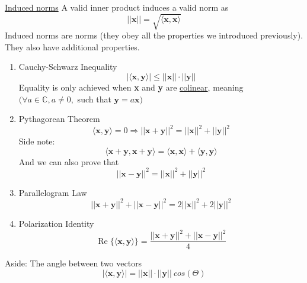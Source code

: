 \documentclass[12pt]{article}
\begin{document}
\underline{Induced norms}
A valid inner product induces a valid norm as 
\begin{equation*}
    ||\mathbf{x}|| = \sqrt{\langle \mathbf{x}, \mathbf{x} \rangle} 
\end{equation*}
Induced norms are norms (they obey all the properties we introduced previously). They also have additional properties. 
\begin{enumerate}
    \item Cauchy-Schwarz Inequality
    \begin{equation*}
        |\langle \mathbf{x}, \mathbf{y} \rangle| \leq ||\mathbf{x}||\cdot||\mathbf{y}||
    \end{equation*}
    Equality is only achieved when \textbf{x} and \textbf{y} are \underline{colinear}, meaning \\ $(\forall a \in \mathbb{C}, a \neq 0,$ such that $\mathbf{y} = a\mathbf{x})$
    \item Pythagorean Theorem 
    \begin{equation*}
        \langle \mathbf{x}, \mathbf{y} \rangle = 0 \Rightarrow ||\mathbf{x} + \mathbf{y}||^2 = ||\mathbf{x}||^2 + ||\mathbf{y}||^2 
    \end{equation*}
    Side note:
    \begin{equation*}
         \langle \mathbf{x+y}, \mathbf{x+y} \rangle =   \langle \mathbf{x}, \mathbf{x} \rangle +  \langle \mathbf{y}, \mathbf{y} \rangle
    \end{equation*}
    And we can also prove that 
    \begin{equation*}
         ||\mathbf{x} - \mathbf{y}||^2 = ||\mathbf{x}||^2 + ||\mathbf{y}||^2 
    \end{equation*}
    \item Parallelogram Law 
    \begin{equation*}
        ||\mathbf{x} + \mathbf{y}||^2 + ||\mathbf{x} - \mathbf{y}||^2  = 2||\mathbf{x}||^2 + 2||\mathbf{y}||^2 
    \end{equation*}
    \item Polarization Identity
    \begin{equation*}
        \operatorname{Re}\{\langle \mathbf{x}, \mathbf{y} \rangle \} = \frac{||\mathbf{x} + \mathbf{y}||^2 + ||\mathbf{x} - \mathbf{y}||^2}{4}
    \end{equation*}
\end{enumerate}
Aside: The angle between two vectors 
\begin{equation*}
    |\langle \mathbf{x}, \mathbf{y} \rangle| = ||\mathbf{x}||\cdot||\mathbf{y}|| \: cos(\Theta)
\end{equation*}
\end{document}
